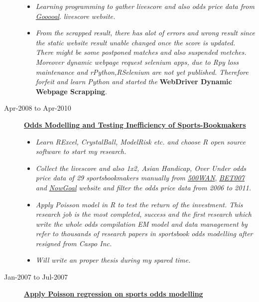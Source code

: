 \documentclass[]{article}
\providecommand{\tightlist}{%
  \setlength{\itemsep}{0pt}\setlength{\parskip}{0pt}}
\begin{document}
\begin{description}
\begin{itemize}
\tightlist
\item
  \emph{Learning programming to gather livescore and also odds price
  data from}
  \href{http://app.en.gooooal.com/soccer/statistic/standing.do}{\emph{Gooooal}}.
  \emph{livescore website.}
\item
  \emph{From the scrapped result, there has alot of errors and wrong
  result since the static website result unable changed once the score
  is updated. There might be some postponed matches and also suspended
  metches. Moreover dynamic webpage request selenium apps, due to Rpy
  loss maintenance and rPython,RSelenium are not yet published.
  Therefore forfeit and learn Python and started the} \textbf{WebDriver
  Dynamic Webpage Scrapping}.
\end{itemize}
\item[Apr-2008 to Apr-2010]
\href{https://www.dropbox.com/sh/ifwczokjptt6re0/AADv1VarJoQ6IgIitZBzG5c6a?dl=0}{\textbf{Odds
Modelling and Testing Inefficiency of Sports-Bookmakers}}

\begin{itemize}
\tightlist
\item
  \emph{Learn RExcel, CrystalBall, ModelRisk etc. and choose R open
  source software to start my research.}
\item
  \emph{Collect the livescore and also 1x2, Asian Handicap, Over Under
  odds price data of 29 sportsbookmakers manually from}
  \href{http://www.500wan.com}{\emph{500WAN}},
  \href{http://www.bet007.com}{\emph{BET007}} \emph{and}
  \href{http://info.nowgoal.com/en/}{\emph{NowGoal}} \emph{website and
  filter the odds price data from 2006 to 2011.}
\item
  \emph{Apply Poisson model in R to test the return of the investment.
  This research job is the most completed, success and the first
  research which write the whole odds compilation EM model and data
  management by refer to thousands of research papers in sportsbook odds
  modelling after resigned from Caspo Inc.}
\item
  \emph{Will write an proper thesis during my spared time.}
\end{itemize}
\item[Jan-2007 to Jul-2007]
\href{https://www.dropbox.com/sh/h3e6gv59onz311j/AAAFcfFOfon-kEhveTzvHGHza?dl=0}{\textbf{Apply
Poisson regression on sports odds modelling}}


\end{description}
\end{document}
